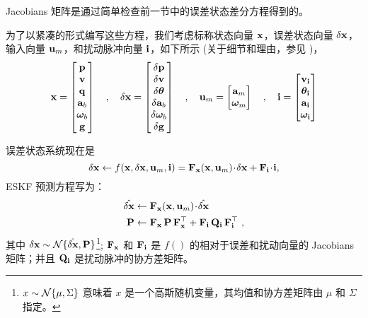 Jacobians 矩阵是通过简单检查前一节中的误差状态差分方程得到的。 

为了以紧凑的形式编写这些方程，我们考虑标称状态向量 ${\bf x}$，误差状态向量 $\delta{\bf x}$，输入向量 ${\bf u}_m$，和扰动脉冲向量 ${\bf i}$，如下所示 (关于细节和理由，参见 )，
%
\begin{equation}
{\bf x}=\begin{bmatrix}{\bf p}\\{\bf v}\\{\bf q}\\{\bf a}_b\\{\bm \omega}_b\\{\bf g}\end{bmatrix} \quad, \quad
\delta{\bf x}=\begin{bmatrix}\delta{\bf p}\\\delta{\bf v}\\\delta{\bm \theta}\\\delta{\bf a}_b\\\delta{\bm \omega}_b\\\delta{\bf g}\end{bmatrix} \quad, \quad
{\bf u}_m = \begin{bmatrix}
{\bf a}_m \\
{\bm \omega}_m
\end{bmatrix} 
\quad,  \quad
{\bf i} = \begin{bmatrix}
{\bf v}_{\bf i} \\
{\bm \theta}_{\bf i} \\
{\bf a}_{\bf i} \\
{\bm \omega}_{\bf i}
\end{bmatrix}
\end{equation}


\bigskip
误差状态系统现在是
%
\begin{equation}
\delta{\bf x} \gets f({\bf x},\delta{\bf x},{\bf u}_m,{\bf i})={\bf F}_{\bf x}({\bf x}, {\bf u}_m)\!\cdot\! \delta{\bf x}+{\bf F}_{\bf i}\!\cdot\!{\bf i},
\end{equation}
%
ESKF 预测方程写为：
%
%
\begin{align}
\hat{\delta{\bf x}} &\gets {\bf F}_{\bf x}({\bf x}, {\bf u}_m)\!\cdot\! \hat{\delta{\bf x}} \label{equ:errorMeanPred} \\
{\bf P} &\gets {\bf F}_{\bf x}\,{\bf P}\,{\bf F}_{\bf x}^{\top} + {\bf F}_{\bf i}\,{\bf Q}_{\bf i}\,{\bf F}_{\bf i}^{\top} \label{equ:errorCovPred} ~,
\end{align}%
%
其中 $\delta{\bf x}\sim\mathcal{N}\{\hat{\delta{\bf x}},{\bf P}\}$\footnote{$x\sim\mathcal{N}\{\mu,\Sigma\}$ 意味着 $x$ 是一个高斯随机变量，其均值和协方差矩阵由 $\mu$ 和 $\Sigma$指定。}; ${\bf F}_{\bf x}$ 和 ${\bf F}_{\bf i}$ 是 $f()$ 的相对于误差和扰动向量的 Jacobians 矩阵；并且 ${\bf Q}_{\bf i}$ 是扰动脉冲的协方差矩阵。

